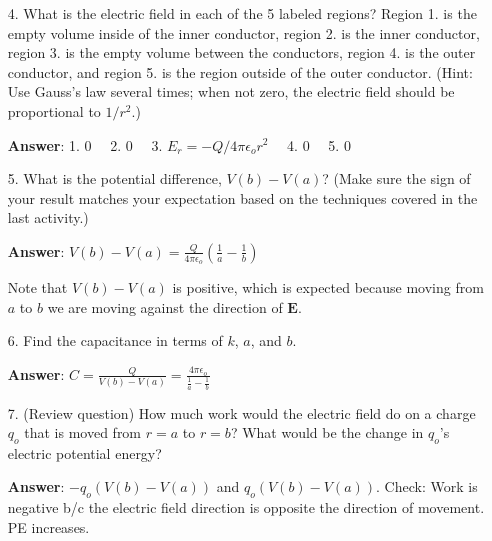 \documentclass{article}
\begin{document}
\begin{enumerate}

  \item[4.] What is the electric field in each of the 5 labeled regions? Region 1. is the empty volume inside of the inner conductor, region 2. is the inner conductor, region 3. is the empty volume between the conductors, region 4. is the outer conductor, and region 5. is the region outside of the outer conductor. (Hint: Use Gauss's law several times; when not zero, the electric field should be proportional to $1/r^2$.)

     \ifsolutions
       \textbf{Answer}: 1. $0\quad$ 2. $0\quad$ 3. $E_r=-Q/4\pi \epsilon_o r^2\quad$ 4. $0\quad$ 5. $0$
     \else
       \vskip 48pt
     \fi
     \ifsolutions\else
     \vskip 48pt
     \fi

  \item[5.] What is the potential difference, $V(b) - V(a)$? (Make sure the sign of your result matches your expectation based on the techniques covered in the last activity.)

     \ifsolutions
       \textbf{Answer}: $\displaystyle V(b)-V(a)=\frac{Q}{4\pi\epsilon_o}\left(\frac{1}{a}-\frac{1}{b}\right)$

       Note that $V(b)-V(a)$ is positive, which is expected because moving from $a$ to $b$ we are moving against the direction of $\mathbf{E}$.
     \else
       \vskip 48pt
     \fi
     \ifsolutions\else
     \vskip 48pt
     \fi

  \item[6.] Find the capacitance in terms of $k$, $a$, and $b$.

     \ifsolutions
       \textbf{Answer}: $\displaystyle C=\frac{Q}{V(b)-V(a)} = \frac{4\pi\epsilon_o}{\frac{1}{a}-\frac{1}{b}}$
     \else
       \vskip 48pt
     \fi
     \ifsolutions\else
     \vskip 48pt
     \fi

  \item[7.] (Review question) How much work would the electric field do on a charge $q_o$ that is moved from $r=a$ to $r=b$? What would be the change in $q_o$'s electric potential energy?

     \ifsolutions
       \textbf{Answer}: $-q_o(V(b)-V(a))$ and $q_o(V(b)-V(a))$. Check: Work is negative b/c the electric field direction is opposite the direction of movement. PE increases.
     \fi

\end{enumerate}
\end{document}
